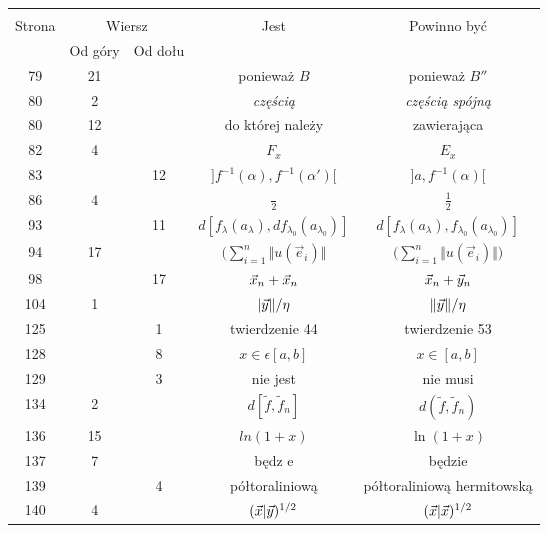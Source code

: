 \documentclass[a4paper,11pt]{article}
\begin{document}
\begin{center}

  \begin{tabular}{|c|c|c|c|c|}
    \hline
    & \multicolumn{2}{c|}{} & & \\
    Strona & \multicolumn{2}{c|}{Wiersz} & Jest
                              & Powinno być \\ \cline{2-3}
    & Od góry & Od dołu & & \\
    \hline
    79  & 21 & & ponieważ $B$ & ponieważ $B''$ \\
    80  &  2 & & \textit{częścią} & \textit{częścią spójną} \\
    80  & 12 & & do której należy & zawierająca \\
    82  &  4 & & $F_{ x }$ & $E_{ x }$ \\
    83  & & 12 & $] f^{ - 1 }( \alpha ), f^{ -1 }( \alpha' ) [$
           & $] a, f^{ -1 }( \alpha ) [$ \\
    86  &  4 & & $\frac{ {} }{ 2 }$ & $\frac{ 1 }{ 2 }$ \\
    93  & & 11 & $d[ f_{ \lambda }( a_{ \lambda } ), df_{ \lambda_{ 0 } }( a_{ \lambda_{ 0 } } ) ]$
           & $d[ f_{ \lambda }( a_{ \lambda } ), f_{ \lambda_{ 0 } }( a_{ \lambda_{ 0 } } ) ]$ \\
    94  & 17 & & $\big( \sum_{ i = 1 }^{ n } \Vert u( \vec{ e }_{ i } ) \Vert$
           & $\big( \sum_{ i = 1 }^{ n } \Vert u( \vec{ e }_{ i } ) \Vert \big)$ \\
    98  & & 17 & $\vec{ x }_{ n } + \vec{ x }_{ n }$
           & $\vec{ x }_{ n } + \vec{ y }_{ n }$ \\
    104 &  1 & & $| \vec{ y } \Vert / \eta$ & $\Vert \vec{ y } \Vert / \eta$ \\
    125 & &  1 & twierdzenie 44 & twierdzenie 53 \\
    128 & &  8 & $x \in \epsilon [ a, b ]$ & $x \in [ a, b ]$ \\
    129 & &  3 & nie jest & nie musi \\
    134 &  2 & & $d[ \tilde{ f }, \tilde{ f }_{ n } ]$
           & $d( \tilde{ f }, \tilde{ f }_{ n } )$ \\
    136 & 15 & & $ln( 1 + x )$ & $\ln( 1 + x )$ \\
    137 &  7 & & będz e & będzie \\
    139 & &  4 & półtoraliniową & półtoraliniową hermitowską \\
    140 &  4 & & $( \vec{ x } | \vec{ y } )^{ 1 / 2 }$
           & $( \vec{ x } | \vec{ x } )^{ 1 / 2 }$ \\

\end{tabular}
\end{center}
\end{document}
